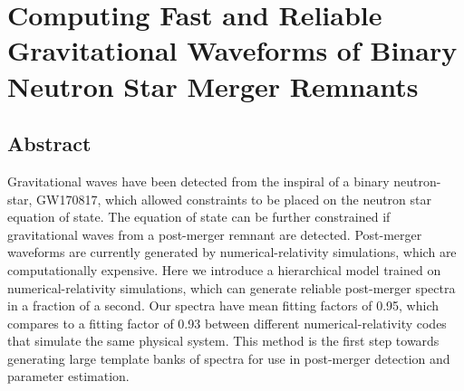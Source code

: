 \documentclass[../Thesis.tex]{subfiles}
\begin{document}
\begingroup
\clearpage%
\let\clearpage\relax%
\vspace*{-2cm}%



\chapter{Computing Fast and Reliable Gravitational Waveforms of Binary Neutron Star Merger Remnants}
\label{chapter:ComputingFastReliable}
\endgroup 







\section*{Abstract}
	Gravitational waves have been detected from the inspiral of a binary neutron-star, GW170817, which allowed constraints to be placed on the neutron star equation of state. The equation of state can be further constrained if gravitational waves from a post-merger remnant are detected. Post-merger waveforms are currently generated by numerical-relativity simulations, which are computationally expensive. Here we introduce a hierarchical model trained on numerical-relativity simulations, which can generate reliable post-merger spectra in a fraction of a second. Our spectra have mean fitting factors of 0.95, which compares to a fitting factor of 0.93 between different numerical-relativity codes that simulate the same physical system. This method is the first step towards generating large template banks of spectra for use in post-merger detection and parameter estimation.
\end{document}
